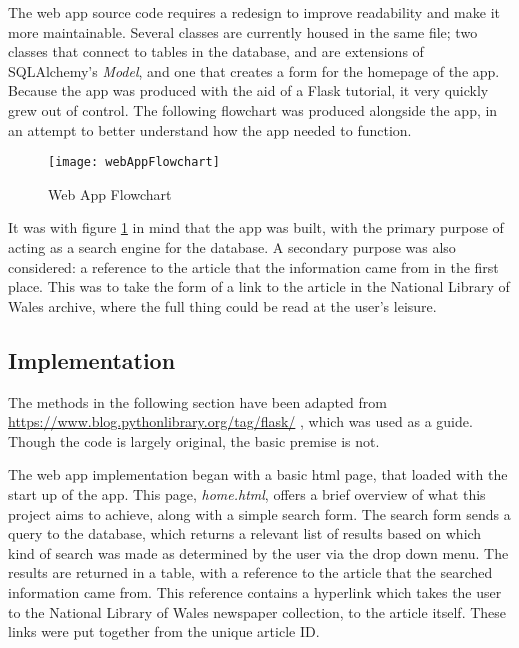 \documentclass[11pt,a4paper]{book}
\begin{document}
The web app source code requires a redesign to improve readability and make it more maintainable. Several classes are currently housed in the same file; two classes that connect to tables in the database, and are extensions of SQLAlchemy's \textit{Model}, and one that creates a form for the homepage of the app. Because the app was produced with the aid of a Flask tutorial, it very quickly grew out of control. The following flowchart was produced alongside the app, in an attempt to better understand how the app needed to function.
\begin{figure}[H]
	\centering
	\texttt{[image: webAppFlowchart]}
	\caption{Web App Flowchart}
	\label{fig:waf}
\end{figure}
It was with figure \ref{fig:waf} in mind that the app was built, with the primary purpose of acting as a search engine for the database. A secondary purpose was also considered: a reference to the article that the information came from in the first place. This was to take the form of a link to the article in the National Library of Wales archive, where the full thing could be read at the user's leisure.

\subsection{Implementation}
The methods in the following section have been adapted from \url{https://www.blog.pythonlibrary.org/tag/flask/}
, which was used as a guide. Though the code is largely original, the basic premise is not.

The web app implementation began with a basic html page, that loaded with the start up of the app. This page, \textit{home.html}, offers a brief overview of what this project aims to achieve, along with a simple search form. The search form sends a query to the database, which returns a relevant list of results based on which kind of search was made as determined by the user via the drop down menu. The results are returned in a table, with a reference to the article that the searched information came from. This reference contains a hyperlink which takes the user to the National Library of Wales newspaper collection, to the article itself. These links were put together from the unique article ID.
\end{document}
